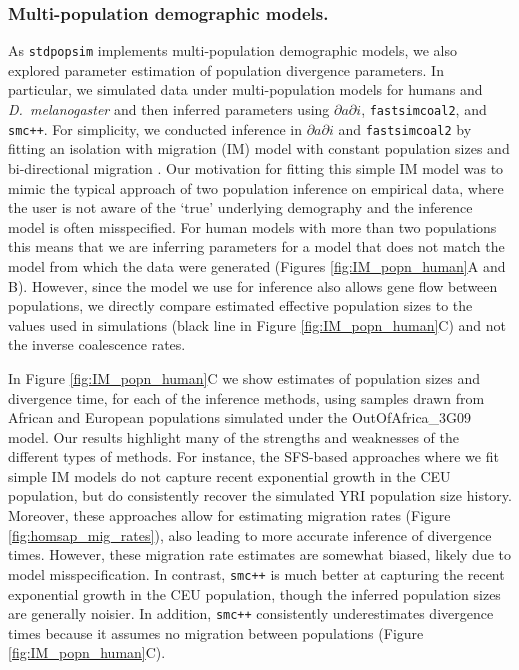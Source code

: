 \documentclass[12pt,halfline,a4paper]{ouparticle}
\newcommand{\stdpopsim}{\texttt{stdpopsim}\xspace}
\newcommand{\dadi}{$\partial a \partial i$\xspace}
\newcommand{\smcpp}{\texttt{smc++}\xspace}
\newcommand{\fastsimcoal}{\texttt{fastsimcoal2}\xspace}
\begin{document}
\subsubsection*{Multi-population demographic models.}
As \stdpopsim implements multi-population demographic models, we also
explored parameter estimation of population divergence parameters. In particular,
we simulated data under multi-population models for humans and \textit{D.~melanogaster}
and then inferred  parameters using \dadi, \fastsimcoal, and \smcpp.
For simplicity, we conducted inference in \dadi and \fastsimcoal by fitting an isolation with migration (IM) model
with constant population sizes and bi-directional migration \citep{hey2004im}.
Our motivation for fitting this simple
IM model was to mimic the typical approach of two population inference on empirical
data, where the user is not aware of the `true' underlying demography and the inference
model is often misspecified.
For human models with more than two populations \citep[e.g.,][]{gutenkunst2009inferring}
this means that we are inferring parameters for a model that does
not match the model from which the data were generated (Figures
\ref{fig:IM_popn_human}A and B). However, since the model we use for inference also
allows gene flow between populations, we directly compare estimated effective population sizes
to the values used in simulations (black line in Figure \ref{fig:IM_popn_human}C)
and not the inverse coalescence rates.

In Figure \ref{fig:IM_popn_human}C we show estimates of population sizes and divergence
time, for each of the inference methods, using samples drawn from African and European populations
simulated under the OutOfAfrica\_3G09 model. Our results highlight many
of the strengths and weaknesses of the different types of methods.
For instance, the SFS-based approaches where we fit simple IM models do not capture
recent exponential growth in the CEU population, but do consistently recover the
simulated YRI population size history. Moreover, these approaches allow for estimating
migration rates (Figure \ref{fig:homsap_mig_rates}), also leading to more accurate inference
of divergence times. However, these migration rate estimates are somewhat biased,
likely due to model misspecification.
In contrast, \smcpp is much better at capturing the recent exponential
growth in the CEU population, though the inferred population sizes are generally noisier.
In addition, \smcpp consistently underestimates divergence times
because it assumes no migration between populations (Figure \ref{fig:IM_popn_human}C).
\end{document}
